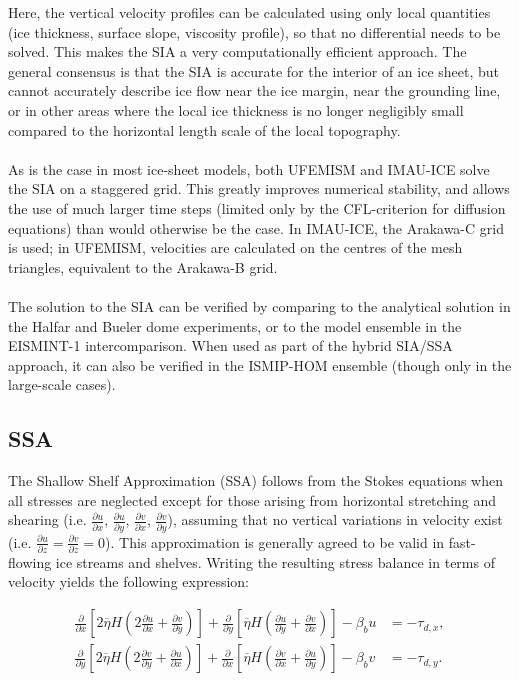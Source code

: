 \documentclass{article}
\begin{document}
Here, the vertical velocity profiles can be calculated using only local quantities (ice thickness, surface slope, viscosity profile), so that no differential needs to be solved. This makes the SIA a very computationally efficient approach. The general consensus is that the SIA is accurate for the interior of an ice sheet, but cannot accurately describe ice flow near the ice margin, near the grounding line, or in other areas where the local ice thickness is no longer negligibly small compared to the horizontal length scale of the local topography.\\
\\
As is the case in most ice-sheet models, both UFEMISM and IMAU-ICE solve the SIA on a staggered grid. This greatly improves numerical stability, and allows the use of much larger time steps (limited only by the CFL-criterion for diffusion equations) than would otherwise be the case. In IMAU-ICE, the Arakawa-C grid is used; in UFEMISM, velocities are calculated on the centres of the mesh triangles, equivalent to the Arakawa-B grid.\\
\\
The solution to the SIA can be verified by comparing to the analytical solution in the Halfar and Bueler dome experiments, or to the model ensemble in the EISMINT-1 intercomparison. When used as part of the hybrid SIA/SSA approach, it can also be verified in the ISMIP-HOM ensemble (though only in the large-scale cases).

\subsection{SSA}

The Shallow Shelf Approximation (SSA) follows from the Stokes equations when all stresses are neglected except for those arising from horizontal stretching and shearing (i.e. $\frac{\partial u}{\partial x}$, $\frac{\partial u}{\partial y}$, $\frac{\partial v}{\partial x}$, $\frac{\partial v}{\partial y}$), assuming that no vertical variations in velocity exist (i.e. $\frac{\partial u}{\partial z} = \frac{\partial v}{\partial z} = 0$). This approximation is generally agreed to be valid in fast-flowing ice streams and shelves. Writing the resulting stress balance in terms of velocity yields the following expression:

\begin{align} \label{eq:SSA_01}
\frac{\partial}{\partial x} \left[ 2 \overline{\eta} H \left( 2 \frac{\partial u}{\partial x} + 
\frac{\partial v}{\partial y} \right) \right] + 
\frac{\partial}{\partial y} \left[ \overline{\eta} H \left( \frac{\partial u}{\partial y} + 
\frac{\partial v}{\partial x} \right) \right] - \beta_b u &= -\tau_{d,x}, \\
\frac{\partial}{\partial y} \left[ 2 \overline{\eta} H \left( 2 \frac{\partial v}{\partial y} + 
\frac{\partial u}{\partial x} \right) \right] + 
\frac{\partial}{\partial x} \left[ \overline{\eta} H \left( \frac{\partial v}{\partial x} + 
\frac{\partial u}{\partial y} \right) \right] - \beta_b v &= -\tau_{d,y}.
\end{align}
\end{document}
